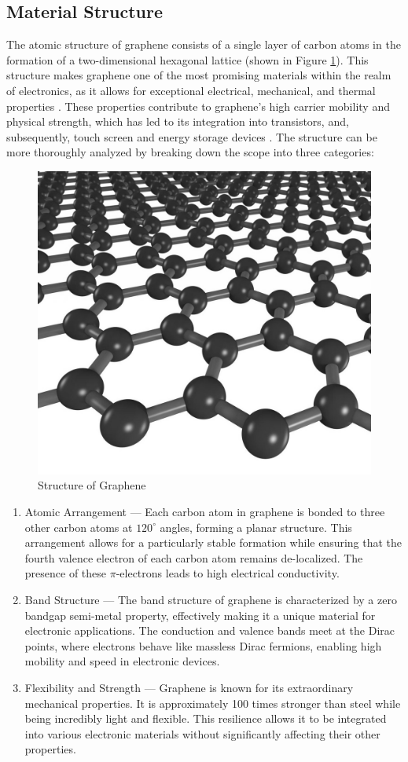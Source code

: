 \documentclass[conference]{IEEEtran}
\begin{document}
\subsection{Material Structure}

The atomic structure of graphene consists of a single layer of carbon atoms in the formation of a two-dimensional hexagonal lattice (shown in Figure \ref{fig:1}). This structure makes graphene one of the most promising materials within the realm of electronics, as it allows for exceptional electrical, mechanical, and thermal properties \cite{mb1}. These properties contribute to graphene's high carrier mobility and physical strength, which has led to its integration into transistors, and, subsequently, touch screen and energy storage devices \cite{mb2}. The structure can be more thoroughly analyzed by breaking down the scope into three categories:

\begin{figure}[h]
  \centering
  \includegraphics[width=.4\textwidth]{Figures/Graphene}
  \caption{Structure of Graphene}
  \label{fig:1}
\end{figure}

\begin{enumerate}

  \item Atomic Arrangement — Each carbon atom in graphene is bonded to three other carbon atoms at $120^{\circ}$ angles, forming a planar structure. This arrangement allows for a particularly stable formation while ensuring that the fourth valence electron of each carbon atom remains de-localized. The presence of these $\pi$-electrons leads to high electrical conductivity.

  \item Band Structure — The band structure of graphene is characterized by a zero bandgap semi-metal property, effectively making it a unique material for electronic applications. The conduction and valence bands meet at the Dirac points, where electrons behave like massless Dirac fermions, enabling high mobility and speed in electronic devices.

  \item Flexibility and Strength — Graphene is known for its extraordinary mechanical properties. It is approximately 100 times stronger than steel while being incredibly light and flexible. This resilience allows it to be integrated into various electronic materials without significantly affecting their other properties.

\end{enumerate}
\end{document}
